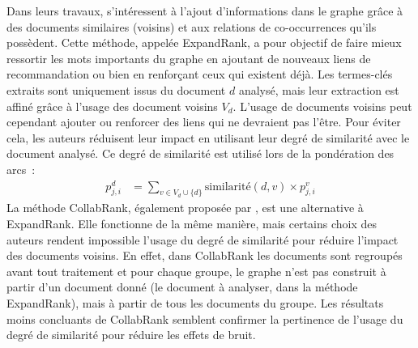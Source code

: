           Dans leurs travaux,  s'intéressent à l'ajout
          d'informations dans le graphe grâce à des documents similaires
          (voisins) et aux relations de co-occurrences qu'ils possèdent. Cette
          méthode, appelée ExpandRank, a pour objectif de faire mieux ressortir
          les mots importants du graphe en ajoutant de nouveaux liens de
          recommandation ou bien en renforçant ceux qui existent déjà. Les
          termes-clés extraits sont uniquement issus du document $d$ analysé,
          mais leur extraction est affiné grâce à l'usage des document voisins
          $V_d$. L'usage de documents voisins peut cependant ajouter ou
          renforcer des liens qui ne devraient pas l'être. Pour éviter cela, les
          auteurs réduisent leur impact en utilisant leur degré de similarité
          avec le document analysé. Ce degré de similarité est utilisé lors de
          la pondération des arcs~:
          \begin{align}
            p_{j, i}^d &= \sum_{v \in V_d \cup \{d\}} \text{similarité}(d, v) \times p_{j, i}^v
          \end{align}
          La méthode CollabRank, également proposée par
          , est une alternative à ExpandRank. Elle
          fonctionne de la même manière, mais certains choix des auteurs rendent
          impossible l'usage du degré de similarité pour réduire l'impact des
          documents voisins. En effet, dans CollabRank les documents sont
          regroupés avant tout traitement et pour chaque groupe, le graphe n'est
          pas construit à partir d'un document donné (le document à analyser,
          dans la méthode ExpandRank), mais à partir de tous les documents du
          groupe. Les résultats moins concluants de CollabRank semblent
          confirmer la pertinence de l'usage du degré de similarité pour réduire
          les effets de bruit.

